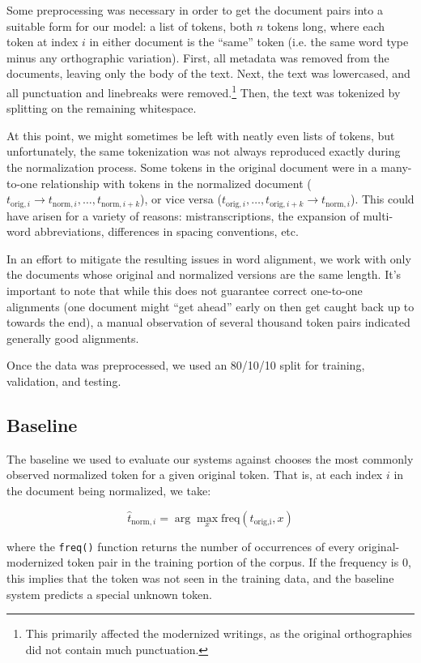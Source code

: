 \documentclass[11pt,a4paper]{article}
\begin{document}
Some preprocessing was necessary in order to get the document pairs into a suitable form for our model: a list of tokens, both $n$ tokens long, where each token at index $i$ in either document is the ``same'' token (i.e. the same word type minus any orthographic variation). First, all metadata was removed from the documents, leaving only the body of the text. Next, the text was lowercased, and all punctuation and linebreaks were removed.\footnote{This primarily affected the modernized writings, as the original orthographies did not contain much punctuation.} Then, the text was tokenized by splitting on the remaining whitespace.

At this point, we might sometimes be left with neatly even lists of tokens, but unfortunately, the same tokenization was not always reproduced exactly during the normalization process. Some tokens in the original document were in a many-to-one relationship with tokens in the normalized document ($t_{\text{orig},i} \rightarrow t_{\text{norm},i}, \ldots, t_{\text{norm},i+k}$), or vice versa ($t_{\text{orig},i}, \ldots, t_{\text{orig},i+k} \rightarrow t_{\text{norm},i}$). This could have arisen for a variety of reasons: mistranscriptions, the expansion of multi-word abbreviations, differences in spacing conventions, etc. 

In an effort to mitigate the resulting issues in word alignment, we work with only the documents whose original and normalized versions are the same length. It's important to note that while this does not guarantee correct one-to-one alignments (one document might ``get ahead'' early on then get caught back up to towards the end), a manual observation of several thousand token pairs indicated generally good alignments. 

Once the data was preprocessed, we used an 80/10/10 split for training, validation, and testing.

\subsection{Baseline}
The baseline we used to evaluate our systems against chooses the most commonly observed normalized token for a given original token. That is, at each index $i$ in the document being normalized, we take: 

\[ \hat{t}_{\text{norm},i} = \arg\max_{x} \text{freq}(t_\text{orig,i}, x) \]

\noindent where the \texttt{freq()} function returns the number of occurrences of every original-modernized token pair in the training portion of the corpus. If the frequency is 0, this implies that the token was not seen in the training data, and the baseline system predicts a special unknown token.
\end{document}
